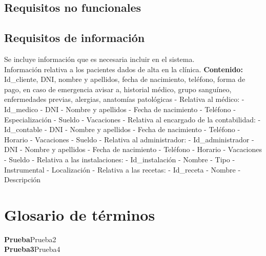 \documentclass[11pt,a4paper]{article}
\newcommand{\term}[2]{\textbf{#1}\quad#2\\}
\begin{document}
    \subsection{Requisitos no funcionales}


  \subsection{Requisitos de información}

  Se incluye información que es necesaria incluir en el sistema.
  \\
  Información relativa a los pacientes dados de alta en la clínica.
    \textbf{Contenido:} Id\_cliente, DNI, nombre y apellidos, fecha de nacimiento, teléfono, forma de pago, en caso de emergencia avisar a, historial médico, grupo sanguíneo, enfermedades previas, alergias, anatomías patológicas
  - Relativa al médico:
    - Id_medico
    - DNI
    - Nombre y apellidos
    - Fecha de nacimiento
    - Teléfono
    - Especialización
    - Sueldo
    - Vacaciones
  - Relativa al encargado de la contabilidad:
    - Id_contable
    - DNI
    - Nombre y apellidos
    - Fecha de nacimiento
    - Teléfono
    - Horario
    - Vacaciones
    - Sueldo
  - Relativa al administrador:
    - Id_administrador
    - DNI
    - Nombre y apellidos
    - Fecha de nacimiento
    - Teléfono
    - Horario
    - Vacaciones
    - Sueldo
  - Relativa a las instalaciones:
    - Id_instalación
    - Nombre
    - Tipo
    - Instrumental
    - Localización
  - Relativa a las recetas:
    - Id_receta
    - Nombre
    - Descripción

\section{Glosario de términos} %
\label{sec:glosario_de_términos}

\term{Prueba}{Prueba2}
\term{Prueba3}{Prueba4}



	
\end{document}

